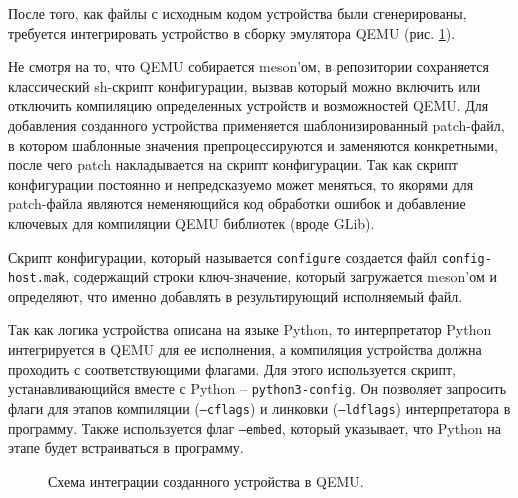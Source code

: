 После того, как файлы с исходным кодом устройства были сгенерированы, требуется
интегрировать устройство в сборку эмулятора QEMU (рис. \ref{fig:qemu-compilation}).

Не смотря на то, что QEMU собирается meson'ом, в репозитории сохраняется
классический sh-скрипт конфигурации, вызвав который можно включить
или отключить компиляцию определенных устройств и возможностей QEMU.
Для добавления созданного устройства применяется шаблонизированный patch-файл,
в котором шаблонные значения препроцессируются и заменяются конкретными,
после чего patch накладывается на скрипт конфигурации.
Так как скрипт конфигурации постоянно и непредсказуемо может меняться,
то якорями для patch-файла являются неменяющийся код обработки ошибок
и добавление ключевых для компиляции QEMU библиотек (вроде GLib).

Скрипт конфигурации, который называется \texttt{configure} создается
файл \texttt{config-host.mak}, содержащий строки ключ-значение,
который загружается meson'ом и определяют, что именно добавлять в
результирующий исполняемый файл.

Так как логика устройства описана на языке Python, то интерпретатор Python
интегрируется в QEMU для ее исполнения, а компиляция устройства должна
проходить с соответствующими флагами. Для этого используется
скрипт, устанавливающийся вместе с Python -- \texttt{python3-config}.
Он позволяет запросить флаги для этапов компиляции (\texttt{--cflags})
и линковки (\texttt{--ldflags}) интерпретатора в программу.
Также используется флаг \texttt{--embed}, который указывает,
что Python на этапе будет встраиваться в программу.

\begin{figure}[!htbp]
    \centering
    
    \caption{Схема интеграции созданного устройства в QEMU.}\label{fig:qemu-compilation}
\end{figure}
